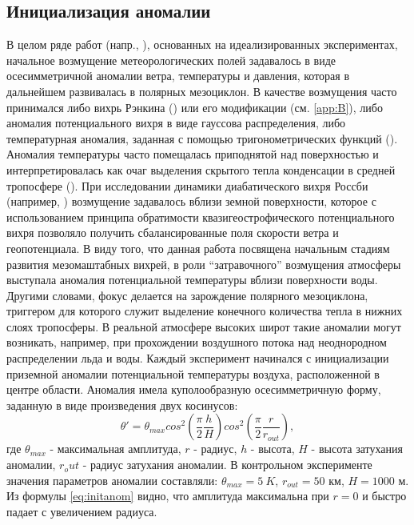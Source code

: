 \documentclass[12pt,a4paper]{report}
\begin{document}
\subsection{Инициализация аномалии}
\label{sec:initanom}
В целом ряде работ (напр., \citep{Adakudlu2012}), основанных на идеализированных экспериментах, начальное возмущение метеорологических полей задавалось в виде осесимметричной аномалии ветра, температуры и давления, которая в дальнейшем развивалась в полярных мезоциклон. В качестве возмущения часто принимался либо вихрь Рэнкина (\citep{EmanuelRotunno1989,YanaseNiino2007}) или его модификации (см. \ref{app:B}), либо аномалия потенциального вихря в виде гауссова распределения, либо температурная аномалия, заданная с помощью тригонометрических функций (\citep{EggerHoinka2010}). Аномалия температуры часто помещалась приподнятой над поверхностью и интерпретировалась как очаг выделения скрытого тепла конденсации в средней тропосфере (\citep{RT2003}). При исследовании динамики диабатического вихря Россби (например, \citep{MooreMontgomery2005}) возмущение задавалось вблизи земной поверхности, которое с использованием принципа обратимости квазигеострофического потенциального вихря  позволяло получить сбалансированные поля скорости ветра и геопотенциала.
В виду того, что данная работа посвящена начальным стадиям развития мезомаштабных вихрей, в роли “затравочного” возмущения атмосферы выступала аномалия потенциальной температуры вблизи поверхности воды. Другими словами, фокус делается на зарождение полярного мезоциклона, триггером для которого служит выделение конечного количества тепла в нижних слоях тропосферы. В реальной атмосфере высоких широт такие аномалии могут возникать, например, при прохождении воздушного потока над неоднородном распределении льда и воды.
Каждый эксперимент начинался с инициализации приземной аномалии потенциальной температуры воздуха, расположенной в центре области. Аномалия имела куполообразную осесимметричную форму, заданную в виде произведения двух косинусов:
\begin{equation}\label{eq:initanom}
\theta'=\theta_{max}cos^2\left(\frac{\pi}{2}\frac{h}{H}\right) cos^2\left(\frac{\pi}{2}\frac{r}{r_{out}}\right),
\end{equation}
где $\theta_{max}$ - максимальная амплитуда, $r$ - радиус, $h$ - высота, $H$ - высота затухания аномалии, $r_out$ - радиус затухания аномалии.
В контрольном эксперименте значения параметров аномалии составляли: $\theta_{max}=5~K$, $r_{out}=50$ км, $H=1000$ м. Из формулы \ref{eq:initanom} видно, что амплитуда максимальна при $r=0$ и быстро падает с увеличением радиуса.
\end{document}
